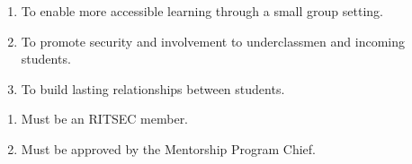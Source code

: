 

\begin{enumerate}
	\item To enable more accessible learning through a small group setting.
	\item To promote security and involvement to underclassmen and incoming students.
	\item To build lasting relationships between students.
\end{enumerate}


\begin{enumerate}
	\item Must be an RITSEC member.
	\item Must be approved by the Mentorship Program Chief.
\end{enumerate}